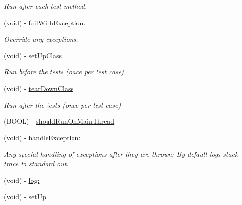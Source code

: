 \begin{DoxyCompactItemize}
\begin{DoxyCompactList}\small\item\em \-Run after each test method. \end{DoxyCompactList}\item 
(void) -\/ \hyperlink{interface_g_h_test_case_aebee380283366e513402d9534e74d044}{fail\-With\-Exception\-:}
\begin{DoxyCompactList}\small\item\em \-Override any exceptions. \end{DoxyCompactList}\item 
\hypertarget{interface_g_h_test_case_ab441989e24b9942b73ed790281c1d967}{
(void) -\/ \hyperlink{interface_g_h_test_case_ab441989e24b9942b73ed790281c1d967}{set\-Up\-Class}}
\label{interface_g_h_test_case_ab441989e24b9942b73ed790281c1d967}

\begin{DoxyCompactList}\small\item\em \-Run before the tests (once per test case) \end{DoxyCompactList}\item 
\hypertarget{interface_g_h_test_case_aa34a28629d36d3ce176b12f4a106dbbd}{
(void) -\/ \hyperlink{interface_g_h_test_case_aa34a28629d36d3ce176b12f4a106dbbd}{tear\-Down\-Class}}
\label{interface_g_h_test_case_aa34a28629d36d3ce176b12f4a106dbbd}

\begin{DoxyCompactList}\small\item\em \-Run after the tests (once per test case) \end{DoxyCompactList}\item 
(\-B\-O\-O\-L) -\/ \hyperlink{interface_g_h_test_case_a08b9bcb2d874b7785918457257446066}{should\-Run\-On\-Main\-Thread}
\item 
\hypertarget{interface_g_h_test_case_a2d3628a89e080f97c76e2d4cb08acce0}{
(void) -\/ \hyperlink{interface_g_h_test_case_a2d3628a89e080f97c76e2d4cb08acce0}{handle\-Exception\-:}}
\label{interface_g_h_test_case_a2d3628a89e080f97c76e2d4cb08acce0}

\begin{DoxyCompactList}\small\item\em \-Any special handling of exceptions after they are thrown; \-By default logs stack trace to standard out. \end{DoxyCompactList}\item 
(void) -\/ \hyperlink{interface_g_h_test_case_a432eee57d9d2fd6cf5fc47c5aac123bc}{log\-:}
\item 
\hypertarget{interface_g_h_test_case_a7982fb6211eca346bd2477ae15d2b6d8}{
(void) -\/ \hyperlink{interface_g_h_test_case_a7982fb6211eca346bd2477ae15d2b6d8}{set\-Up}}
\label{interface_g_h_test_case_a7982fb6211eca346bd2477ae15d2b6d8}


\end{DoxyCompactItemize}
